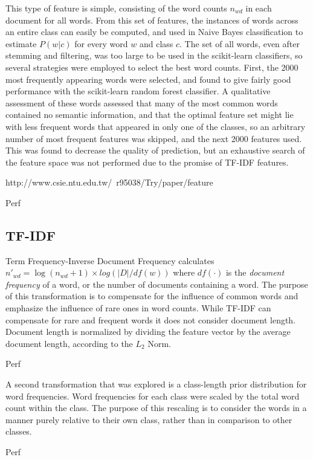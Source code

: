 \documentclass[10pt,twocolumn]{article}
\begin{document}
This type of feature is simple, consisting of the word counts $n_{wd}$ in each document for all words. From this set of features, the instances of words across an entire class can easily be computed, and used in Naive Bayes classification to estimate $P(w | c)$ for every word $w$ and class $c$. The set of all words, even after stemming and filtering, was too large to be used in the scikit-learn classifiers, so several strategies were employed to select the best word counts.  First, the 2000 most frequently appearing words were selected, and found to give fairly good performance with the scikit-learn random forest classifier.  A qualitative assessment of these words assessed that many of the most common words contained no semantic information, and that the optimal feature set might lie with less frequent words that appeared in only one of the classes, so an arbitrary number of most frequent features was skipped, and the next 2000 features used.  This was found to decrease the quality of prediction, but an exhaustive search of the feature space was not performed due to the promise of TF-IDF features.


http://www.csie.ntu.edu.tw/~r95038/Try/paper/feature%


Perf

\subsection*{TF-IDF}

Term Frequency-Inverse Document Frequency calculates $n'_{wd} = \log (n_{wd} + 1) \times log (|D| / df(w))$ where $df(\cdot)$ is the \emph{document frequency} of a word, or the number of documents containing a word. The purpose of this transformation is to compensate for the influence of common words and emphasize the influence of rare ones in word counts. While TF-IDF can compensate for rare and frequent words it does not consider document length. Document length is normalized by dividing the feature vector by the average document length, according to the $L_2$ Norm.

Perf

A second transformation that was explored is a class-length prior distribution for word frequencies. Word frequencies for each class were scaled by the total word count within the class. The purpose of this rescaling is to consider the words in a manner purely relative to their own class, rather than in comparison to other classes.

Perf
\end{document}

